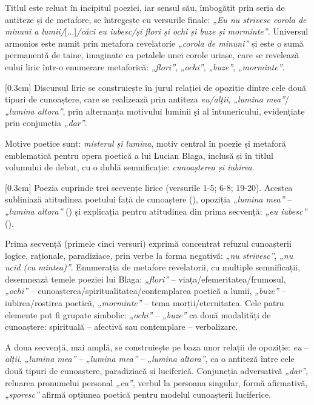 \documentclass[
12pt,                        %
a4paper                      %
]{article}
\newcommand{\rom}[1]{\uppercase\expandafter{\romannumeral #1\relax}} %
\begin{document}
Titlul este reluat în incipitul poeziei, iar sensul său, îmbogățit prin seria de antiteze și de metafore, se întregește cu versurile finale: \textit{„Eu nu strivesc corola de minuni a lumii/}[...]\textit{/căci eu iubesc/și flori și ochi și buze și morminte”}. Universul armonios este numit prin metafora revelatorie \textit{„corola de minuni”} și este o sumă permanentă de taine, imaginate ca petalele unei corole uriașe, care se revelează eului liric într-o enumerare metaforică: \textit{„flori”}, \textit{„ochi”}, \textit{„buze”}, \textit{„morminte”}.

[0.3cm]
Discursul liric se construiește în jurul relației de opoziție dintre cele două tipuri de cunoaștere, care se realizează prin antiteza \textit{eu/alții}, \textit{„lumina mea”}/\textit{„lumina altora”}, prin alternanța motivului luminii și al întunericului, evidențiate prin conjuncția \textit{„dar”}.

Motive poetice sunt: \textit{misterul și lumina}, motiv central în poezie și metaforă emblematică pentru opera poetică a lui Lucian Blaga, inclusă și în titlul volumului de debut, cu o dublă semnificație: \textit{cunoașterea și iubirea}.

[0.3cm]
Poezia cuprinde trei secvențe lirice (versurile 1-5; 6-8; 19-20). Acestea subliniază atitudinea poetului față de cunoaștere (\rom{1}), opoziția \textit{„lumina mea”} -- \textit{„lumina altora”} (\rom{2}) și explicația pentru atitudinea din prima secvență: \textit{„eu iubesc”} (\rom{3}).

Prima secvență (primele cinci versuri) exprimă concentrat refuzul cunoașterii logice, raționale, paradiziace, prin verbe la forma negativă: \textit{„nu strivesc”}, \textit{„nu ucid (cu mintea)”}. Enumerația de metafore revelatorii, cu multiple semnificații, desemnează temele poeziei lui Blaga: \textit{„flori”} -- viața/efemeritatea/frumosul, \textit{„ochi”} -- cunoașterea/spi\-ri\-tua\-li\-ta\-tea/contemplarea poetică a lumii, \textit{„buze”} -- iubirea/rostirea poetică, \textit{„morminte”} -- tema morții/eternitatea. Cele patru elemente pot fi grupate simbolic: \textit{„ochi”} -- \textit{„buze”} ca două modalități de cunoaștere: spirituală -- afectivă sau contemplare -- verbalizare.

A doua secvență, mai amplă, se construiește pe baza unor relații de opoziție: \textit{eu} -- \textit{alții}, \textit{„lumina mea”} -- \textit{„lumina mea”} -- \textit{„lumina altora”}, ca o antiteză între cele două tipuri de cunoaștere, paradiziacă și luciferică. Conjuncția adversativă \textit{„dar”}, reluarea pronumelui personal \textit{„eu”}, verbul la persoana \rom{1} singular, formă afirmativă, \textit{„sporesc”} afirmă opțiunea poetică pentru modelul cunoașterii luciferice.
\end{document}
